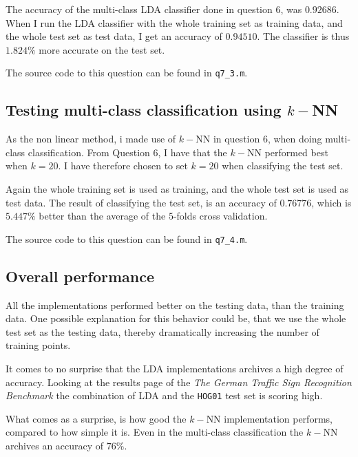 \documentclass[10pt]{article}
\begin{document}
The accuracy of the multi-class LDA classifier done in question 6, was $0.92686$. When I run the LDA classifier with the whole training set as training data, and the whole test set as test data, I get an accuracy of $0.94510$. The classifier is thus $1.824\%$ more accurate on the test set.

The source code to this question can be found in \texttt{q7\_3.m}.


\subsection*{Testing multi-class classification using $k-$NN} %
\label{sub:testing_multi_class_classification_using_knn}
As the non linear method, i made use of $k-$NN in question 6, when doing multi-class classification. From Question 6, I have that the $k-$NN performed best when $k=20$. I have therefore chosen to set $k=20$ when classifying the test set. 

Again the whole training set is used as training, and the whole test set is used as test data. The result of classifying the test set, is an accuracy of $0.76776$, which is $5.447\%$ better than the average of the $5$-folds cross validation.  

The source code to this question can be found in \texttt{q7\_4.m}.

\subsection*{Overall performance} %
\label{sub:overall_performance}

All the implementations performed better on the testing data, than the training data. One possible explanation for this behavior could be, that we use the whole test set as the testing data, thereby dramatically increasing the number of training points.

It comes to no surprise that the LDA implementations archives a high degree of accuracy. Looking at the results page of the \emph{The German Traffic Sign Recognition Benchmark}\cite{resultsURL} the combination of LDA and the \texttt{HOG01} test set is scoring high.

What comes as a surprise, is how good the $k-$NN implementation performs, compared to how simple it is. Even in the multi-class classification the $k-$NN archives an accuracy of $76\%$.
\end{document}
